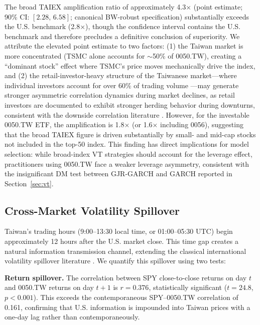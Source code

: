 The broad TAIEX amplification ratio of approximately 4.3$\times$ (point estimate; 90\% CI: $[2.28, \, 6.58]$; canonical BW-robust specification) substantially exceeds the U.S. benchmark (2.8$\times$), though the confidence interval contains the U.S. benchmark and therefore precludes a definitive conclusion of superiority. We attribute the elevated point estimate to two factors: (1) the Taiwan market is more concentrated (TSMC alone accounts for $\sim$50\% of 0050.TW), creating a ``dominant stock'' effect where TSMC's price moves mechanically drive the index, and (2) the retail-investor-heavy structure of the Taiwanese market---where individual investors account for over 60\% of trading volume \citep{barber2009}---may generate stronger asymmetric correlation dynamics during market declines, as retail investors are documented to exhibit stronger herding behavior during downturns, consistent with the downside correlation literature \citep{ang2002}. However, for the investable 0050.TW ETF, the amplification is 1.8$\times$ (or 1.6$\times$ including 0056), suggesting that the broad TAIEX figure is driven substantially by small- and mid-cap stocks not included in the top-50 index. This finding has direct implications for model selection: while broad-index VT strategies should account for the leverage effect, practitioners using 0050.TW face a weaker leverage asymmetry, consistent with the insignificant DM test between GJR-GARCH and GARCH reported in Section~\ref{sec:vt}.

\subsection{Cross-Market Volatility Spillover}
\label{sec:spillover}

Taiwan's trading hours (9:00--13:30 local time, or 01:00--05:30 UTC) begin approximately 12 hours after the U.S. market close. This time gap creates a natural information transmission channel, extending the classical international volatility spillover literature \citep{hamao1990,lin1994}. We quantify this spillover using two tests:

\textbf{Return spillover.} The correlation between SPY close-to-close returns on day $t$ and 0050.TW returns on day $t+1$ is $r = 0.376$, statistically significant ($t = 24.8$, $p < 0.001$). This exceeds the contemporaneous SPY--0050.TW correlation of 0.161, confirming that U.S. information is impounded into Taiwan prices with a one-day lag rather than contemporaneously.

